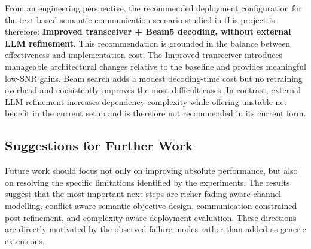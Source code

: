 From an engineering perspective, the recommended deployment configuration for the text-based semantic communication scenario studied in this project is therefore: \textbf{Improved transceiver + Beam5 decoding, without external LLM refinement}. This recommendation is grounded in the balance between effectiveness and implementation cost. The Improved transceiver introduces manageable architectural changes relative to the baseline and provides meaningful low-SNR gains. Beam search adds a modest decoding-time cost but no retraining overhead and consistently improves the most difficult cases. In contrast, external LLM refinement increases dependency complexity while offering unstable net benefit in the current setup and is therefore not recommended in its current form.

\subsection{Suggestions for Further Work}

Future work should focus not only on improving absolute performance, but also on resolving the specific limitations identified by the experiments. The results suggest that the most important next steps are richer fading-aware channel modelling, conflict-aware semantic objective design, communication-constrained post-refinement, and complexity-aware deployment evaluation. These directions are directly motivated by the observed failure modes rather than added as generic extensions.

